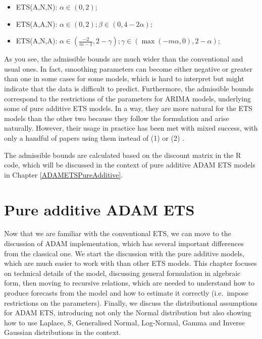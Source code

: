 \documentclass[]{book}
\providecommand{\tightlist}{%
  \setlength{\itemsep}{0pt}\setlength{\parskip}{0pt}}
\theoremstyle{definition}
\theoremstyle{definition}
\theoremstyle{definition}
\theoremstyle{definition}
\theoremstyle{remark}
\begin{document}
\begin{itemize}
\tightlist
\item
  ETS(A,N,N): \(\alpha \in (0, 2)\);
\item
  ETS(A,A,N): \(\alpha \in (0, 2); \beta \in (0, 4-2\alpha)\);
\item
  ETS(A,N,A): \(\alpha \in \left(\frac{-2}{m-1}, 2-\gamma\right); \gamma \in (\max(-m\alpha, 0), 2-\alpha)\);
\end{itemize}

As you see, the admissible bounds are much wider than the conventional and usual ones. In fact, smoothing parameters can become either negative or greater than one in some cases for some models, which is hard to interpret but might indicate that the data is difficult to predict. Furthermore, the admissible bounds correspond to the restrictions of the parameters for ARIMA models, underlying some of pure additive ETS models. In a way, they are more natural for the ETS models than the other two because they follow the formulation and arise naturally. However, their usage in practice has been met with mixed success, with only a handful of papers using them instead of (1) or (2) \citetext{\citealp[e.g.~][]{Gardner2008}; \citealp[mention that they appear in some cases and][ use them in their model]{Snyder2017}}.

The admissible bounds are calculated based on the discount matrix in the R code, which will be discussed in the context of pure additive ADAM ETS models in Chapter \ref{ADAMETSPureAdditive}.

\hypertarget{ADAMETSIntroduction}{%
\chapter{Pure additive ADAM ETS}\label{ADAMETSIntroduction}}

Now that we are familiar with the conventional ETS, we can move to the discussion of ADAM implementation, which has several important differences from the classical one. We start the discussion with the pure additive models, which are much easier to work with than other ETS models. This chapter focuses on technical details of the model, discussing general formulation in algebraic form, then moving to recursive relations, which are needed to understand how to produce forecasts from the model and how to estimate it correctly (i.e.~impose restrictions on the parameters). Finally, we discuss the distributional assumptions for ADAM ETS, introducing not only the Normal distribution but also showing how to use Laplace, S, Generalised Normal, Log-Normal, Gamma and Inverse Gaussian distributions in the context.
\end{document}
